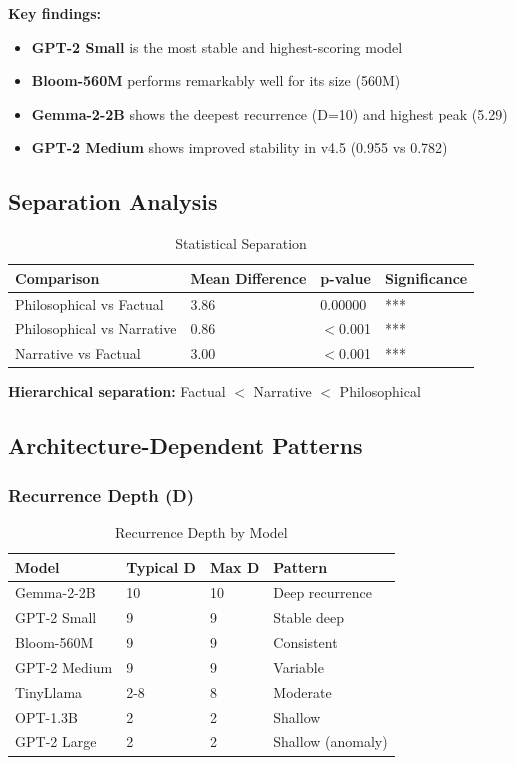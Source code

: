\documentclass[12pt,a4paper]{article}
\begin{document}
\noindent
\textbf{Key findings:}
\begin{itemize}[noitemsep]
    \item \textbf{GPT-2 Small} is the most stable and highest-scoring model
    \item \textbf{Bloom-560M} performs remarkably well for its size (560M)
    \item \textbf{Gemma-2-2B} shows the deepest recurrence (D=10) and highest peak (5.29)
    \item \textbf{GPT-2 Medium} shows improved stability in v4.5 (0.955 vs 0.782)
\end{itemize}

\subsection{Separation Analysis}

\begin{table}[h]
\centering
\caption{Statistical Separation}
\begin{tabular}{llll}
\toprule
\textbf{Comparison} & \textbf{Mean Difference} & \textbf{p-value} & \textbf{Significance} \\
\midrule
Philosophical vs Factual & 3.86 & 0.00000 & *** \\
Philosophical vs Narrative & 0.86 & $<$0.001 & *** \\
Narrative vs Factual & 3.00 & $<$0.001 & *** \\
\bottomrule
\end{tabular}
\end{table}

\textbf{Hierarchical separation:} Factual $<$ Narrative $<$ Philosophical

\subsection{Architecture-Dependent Patterns}

\subsubsection{Recurrence Depth (D)}

\begin{table}[h]
\centering
\caption{Recurrence Depth by Model}
\begin{tabular}{llll}
\toprule
\textbf{Model} & \textbf{Typical D} & \textbf{Max D} & \textbf{Pattern} \\
\midrule
Gemma-2-2B & 10 & 10 & Deep recurrence \\
GPT-2 Small & 9 & 9 & Stable deep \\
Bloom-560M & 9 & 9 & Consistent \\
GPT-2 Medium & 9 & 9 & Variable \\
TinyLlama & 2-8 & 8 & Moderate \\
OPT-1.3B & 2 & 2 & Shallow \\
GPT-2 Large & 2 & 2 & Shallow (anomaly) \\
\bottomrule
\end{tabular}
\end{table}
\end{document}
